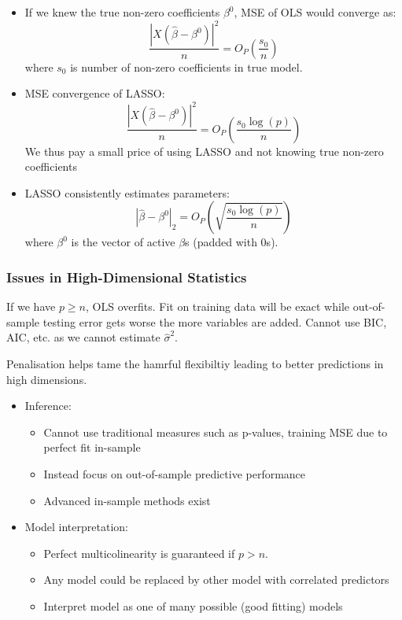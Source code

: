 \documentclass[11pt, %
	oneside, %
	english, %
	onehalfspacing, %
	]{article} %
\numberwithin{equation}{section}
\begin{document}
\begin{itemize}
    \item If we knew the true non-zero coefficients $\beta^0$, MSE of OLS would converge as:
    \begin{equation*}
        \frac{\left|X\left(\widehat{\beta}-\beta^0\right)\right|^2}{n}=O_P\left(\frac{s_0}{n}\right)
    \end{equation*}
    where $s_0$ is number of non-zero coefficients in true model.
    \item MSE convergence of LASSO:
    \begin{equation*}
        \frac{\left|X\left(\widehat{\beta}-\beta^0\right)\right|^2}{n}=O_P\left(\frac{s_0 \log (p)}{n}\right)
    \end{equation*}
    We thus pay a small price of using LASSO and not knowing true non-zero coefficients
    \item LASSO consistently estimates parameters:
    \begin{equation*}
        \left|\hat{\beta}-\beta^0\right|_2=O_P\left(\sqrt{\frac{s_0 \log (p)}{n}}\right)
    \end{equation*}
    where $\beta^0$ is the vector of active $\beta$s (padded with 0s).
\end{itemize}


\subsubsection*{Issues in High-Dimensional Statistics}

If we have $p \geq n$, OLS overfits. Fit on training data will be exact while out-of-sample testing error gets worse the more variables are added. Cannot use BIC, AIC, etc. as we cannot estimate $\hat{\sigma}^2$.

Penalisation helps tame the hamrful flexibiltiy leading to better predictions in high dimensions.



\begin{itemize}
    \item Inference:
    \begin{itemize}
        \item Cannot use traditional measures such as p-values, training MSE due to perfect fit in-sample
        \item Instead focus on out-of-sample predictive performance
        \item Advanced in-sample methods exist
    \end{itemize}
    \item Model interpretation:
    \begin{itemize}
        \item Perfect multicolinearity is guaranteed if $p > n$.
        \item Any model could be replaced by other model with correlated predictors
        \item Interpret model as one of many possible (good fitting) models
    \end{itemize}
\end{itemize}
\end{document}
